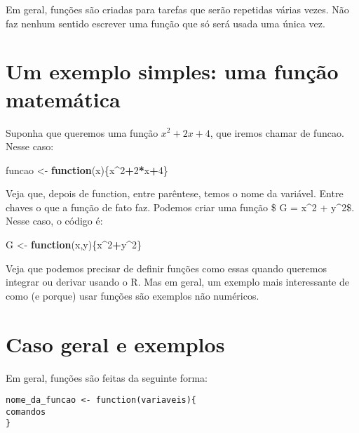 \documentclass[
]{book}
\newenvironment{Shaded}{\begin{snugshade}}{\end{snugshade}}
\newcommand{\ControlFlowTok}[1]{\textcolor[rgb]{0.13,0.29,0.53}{\textbf{#1}}}
\newcommand{\DecValTok}[1]{\textcolor[rgb]{0.00,0.00,0.81}{#1}}
\newcommand{\NormalTok}[1]{#1}
\newcommand{\OperatorTok}[1]{\textcolor[rgb]{0.81,0.36,0.00}{\textbf{#1}}}
\newcommand{\StringTok}[1]{\textcolor[rgb]{0.31,0.60,0.02}{#1}}
\begin{document}
Em geral, funções são criadas para tarefas que serão repetidas várias vezes. Não faz nenhum sentido escrever uma função que só será usada uma única vez.

\hypertarget{um-exemplo-simples-uma-funuxe7uxe3o-matemuxe1tica}{%
\section{Um exemplo simples: uma função matemática}\label{um-exemplo-simples-uma-funuxe7uxe3o-matemuxe1tica}}

Suponha que queremos uma função \(x^2+2x+4\), que iremos chamar de funcao. Nesse caso:

\begin{Shaded}
\begin{Highlighting}[]
\NormalTok{funcao \textless{}{-}}\StringTok{ }\ControlFlowTok{function}\NormalTok{(x)\{x}\OperatorTok{\^{}}\DecValTok{2}\OperatorTok{+}\DecValTok{2}\OperatorTok{*}\NormalTok{x}\OperatorTok{+}\DecValTok{4}\NormalTok{\}}
\end{Highlighting}
\end{Shaded}

Veja que, depois de function, entre parêntese, temos o nome da variável. Entre chaves o que a função de fato faz. Podemos criar uma função \$ G = x\^{}2 + y\^{}2\$. Nesse caso, o código é:

\begin{Shaded}
\begin{Highlighting}[]
\NormalTok{G \textless{}{-}}\StringTok{ }\ControlFlowTok{function}\NormalTok{(x,y)\{x}\OperatorTok{\^{}}\DecValTok{2}\OperatorTok{+}\NormalTok{y}\OperatorTok{\^{}}\DecValTok{2}\NormalTok{\}}
\end{Highlighting}
\end{Shaded}

Veja que podemos precisar de definir funções como essas quando queremos integrar ou derivar usando o R. Mas em geral, um exemplo mais interessante de como (e porque) usar funções são exemplos não numéricos.

\hypertarget{caso-geral-e-exemplos}{%
\section{Caso geral e exemplos}\label{caso-geral-e-exemplos}}

Em geral, funções são feitas da seguinte forma:

\begin{verbatim}
nome_da_funcao <- function(variaveis){
comandos
}
\end{verbatim}
\end{document}
